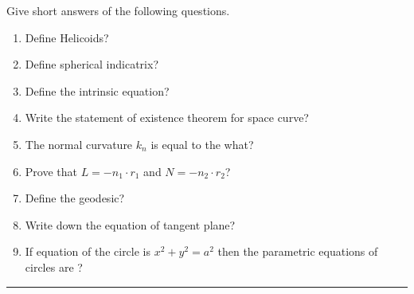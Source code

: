 \documentclass[11pt,paper=a4,answers]{exam}
\begin{document}
\begin{questions}
			
			
			
			\question[08]
			\label{Q:ybus}
			Give short answers of the following questions.
			\begin{enumerate}
				\item Define Helicoids?
				\item Define spherical indicatrix?
				\item Define the intrinsic equation?
				\item Write the statement of existence theorem for space curve?
				\item The normal curvature $k_{n}$ is equal to the what?
				\item Prove that $L = -n_{1} \cdot r_{1}$ and $N = -n_{2}    \cdot r_{2}$?
				\item Define the geodesic?
				\item Write down the equation of tangent plane?
				\item If equation of the circle is $x^{2} + y^{2} = a^{2}$ then the parametric equations            of circles are ?
			\end{enumerate}
		\end{questions}
		\begin{center}
			\rule{.5\textwidth}{1pt}
		\end{center}
	
\end{document}
